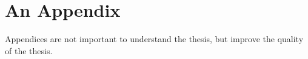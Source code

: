 \chapter{An Appendix}

Appendices are not important to understand the thesis, but improve the quality of the thesis.